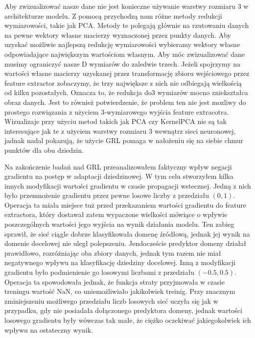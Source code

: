 \documentclass{article}
\begin{document}
\par
Aby zwizualizować nasze dane nie jest konieczne używanie warstwy rozmiaru 3 w architekturze modelu. Z pomocą przychodzą nam różne metody redukcji wymiarowości, takie jak PCA. Metody te polegają głównie na rzutowaniu danych na pewne wektory własne macierzy wyznaczonej przez punkty danych. Aby uzyskać możliwie najlepszą redukcję wymiarowości wybieramy wektory własne odpowiadające największym wartościom własnym. Aby móc zwizualizować dane musimy ograniczyć nasze D wymiarów do zaledwie trzech. Jeżeli spojrzymy na wartości własne macierzy uzyskanej przez transformację zbioru wejściowego przez feature extractor zobaczymy, że trzy największe z nich nie odbiegają wielkością od kilku pozostałych. Oznacza to, że redukcja do3 wymiarów mocno zniekształca obraz danych. Jest to również potwierdzenie, że problem ten nie jest mozliwy do prostego rozwiązania z użyciem 3-wymiarowego wyjścia feature extracotra. Wizualizaje przy użyciu metod takich jak PCA czy KernelPCA nie są tak interesujące jak te z użyciem warstwy rozmiaru 3 wewnątrz sieci neuronowej, jadnak nadal pokazują, że użycie GRL pomaga w nałożeniu się na siebie chmur punktów dla obu dziedzin.
\par
Na zakończenie badań nad GRL przeanalizowałem faktyczny wpływ negacji gradientu na postęp w adaptacji dziedzinowej. W tym celu stworzyłem kilka innych modyfikacji wartości gradientu w czasie propagacji wstecznej. Jedną z nich było przemnożenie gradientu przez pewne losowe liczby z przedziału $(0,1)$. Operacja ta miała miejsce tuż przed przekazaniem wartości gradientu do feature extractora, który dostawał zatem wypaczone wielkości mówiące o wpływie poszczególnych wartości jego wyjścia na wynik działania modelu. Ten zabieg sprawił, że sieć ciągle dobrze klasyfikowała domenę źródłową, jednak jej wynik na domenie docelowej nie uległ polepszeniu. Jendoczeście predyktor domeny działał prawidłowo, rozróżniając oba zbiory danych, jednak tym razem nie miał negatywnego wpływu na klasyfikację dziedziny docelowej. Inną z modyfikacji gradientu było podmienienie go losowymi liczbami z przedziału $(-0.5, 0.5)$. Operacja ta spowodowała jednak, że funkcja straty przyjmowała w czasie treningu wartość NaN, co uniemożliwiało jakikolwiek treinig. Przy znacznym zminiejszeniu możliwego przedziału liczb losowych sieć uczyła się jak w przypadku, gdy nie posiadała dołączonego predyktora domeny, jednak wartości losowego gradientu były wówczas tak małe, że ciężko oczekiwać jakiegokolwiek ich wpływu na ostateczny wynik.
\par
\end{document}
